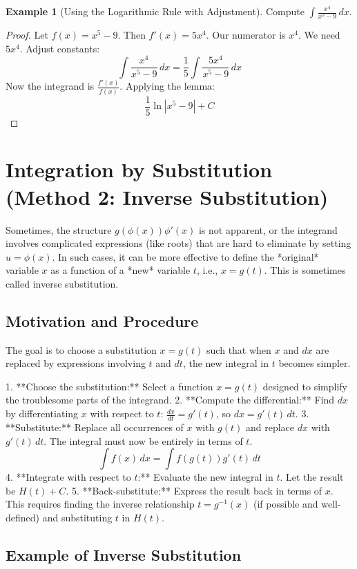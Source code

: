 \documentclass[11pt]{article}
\theoremstyle{definition}
\newtheorem{example}[theorem]{Example}
\theoremstyle{remark}
\begin{document}
\begin{example}[Using the Logarithmic Rule with Adjustment]
Compute $\int \frac{x^4}{x^5-9} \, dx$.
\begin{proof}
Let $f(x) = x^5-9$. Then $f'(x) = 5x^4$.
Our numerator is $x^4$. We need $5x^4$. Adjust constants:
\[ \int \frac{x^4}{x^5-9} \, dx = \frac{1}{5} \int \frac{5x^4}{x^5-9} \, dx \]
Now the integrand is $\frac{f'(x)}{f(x)}$. Applying the lemma:
\[ \frac{1}{5} \ln|x^5-9| + C \]
\end{proof}
\end{example}


\section{Integration by Substitution (Method 2: Inverse Substitution)}

Sometimes, the structure $g(\phi(x))\phi'(x)$ is not apparent, or the integrand involves complicated expressions (like roots) that are hard to eliminate by setting $u = \phi(x)$. In such cases, it can be more effective to define the *original* variable $x$ as a function of a *new* variable $t$, i.e., $x = g(t)$. This is sometimes called inverse substitution.

\subsection{Motivation and Procedure}
The goal is to choose a substitution $x=g(t)$ such that when $x$ and $dx$ are replaced by expressions involving $t$ and $dt$, the new integral in $t$ becomes simpler.

1.  **Choose the substitution:** Select a function $x = g(t)$ designed to simplify the troublesome parts of the integrand.
2.  **Compute the differential:** Find $dx$ by differentiating $x$ with respect to $t$: $\frac{dx}{dt} = g'(t)$, so $dx = g'(t) \, dt$.
3.  **Substitute:** Replace all occurrences of $x$ with $g(t)$ and replace $dx$ with $g'(t) \, dt$. The integral must now be entirely in terms of $t$.
    \[ \int f(x) \, dx = \int f(g(t)) g'(t) \, dt \]
4.  **Integrate with respect to \texorpdfstring{$t$}{t}:** Evaluate the new integral in $t$. Let the result be $H(t) + C$.
5.  **Back-substitute:** Express the result back in terms of $x$. This requires finding the inverse relationship $t = g^{-1}(x)$ (if possible and well-defined) and substituting $t$ in $H(t)$.

\subsection{Example of Inverse Substitution}
\end{document}
